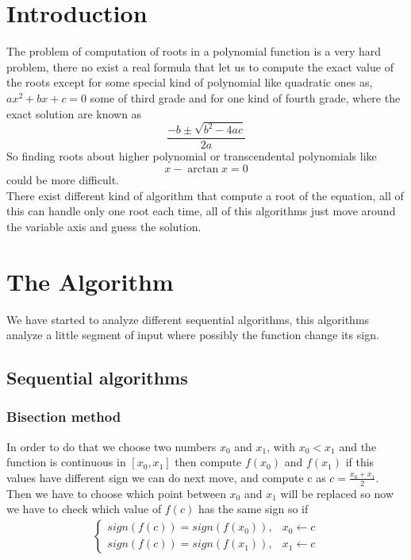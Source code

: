 \documentclass[a4paper,11pt,oneside]{book}
\begin{document}
\pagestyle{myheadings}



\newpage
\thispagestyle{empty}


\tableofcontents \thispagestyle{empty}

\chapter*{Introduction}

The problem of computation of roots in a polynomial function is a very hard problem, there no exist a real formula that let us to compute the exact value of the roots except for some special kind of polynomial like quadratic ones as, $ax^2+bx+c=0$ some of third grade and for one kind of fourth grade, where the exact solution are known as $$\frac{-b\pm\sqrt{b^2-4ac}}{2a}$$ So finding roots about higher polynomial or transcendental polynomials like $$x-\arctan{x}=0$$ could be more difficult. \\ There exist different kind of algorithm that compute a root of the equation, all of this can handle only one root each time, all of this algorithms just move around the variable axis and guess the solution.\\


\chapter*{The Algorithm}

We have started to analyze different sequential algorithms, this algorithms analyze a little segment of input where possibly the function change its sign.


\section*{Sequential algorithms}
\subsection*{Bisection method}

In order to do that we choose two numbers $x_0$ and $x_1$, with $x_0 < x_1$ and the function is continuous in $[x_0, x_1]$ then compute $f(x_0)$ and $f(x_1)$ if this values have different sign we can do next move, and compute c as $c = \frac{x_0 + x_1}{2}$. Then we have to choose which point between $x_0$ and $x_1$ will be replaced so now we have to check which value of $f(c)$ has the same sign so if 
\begin{displaymath}
\begin{aligned}
\begin{cases}
sign(f(c)) = sign(f(x_0)), & x_0 \gets c \\
sign(f(c)) = sign(f(x_1)), & x_1 \gets c 
\end{cases}
\end{aligned}
\end{displaymath}
\end{document}
